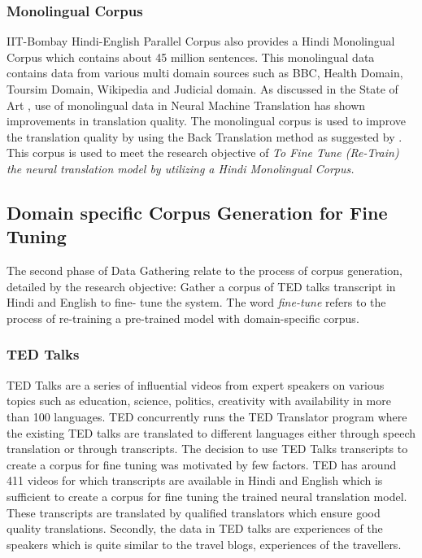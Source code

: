 \subsubsection{Monolingual Corpus}
\label{sec:mono}
IIT-Bombay Hindi-English Parallel Corpus also provides a Hindi Monolingual Corpus which contains about 45 million sentences. This monolingual data contains data from various multi domain sources such as BBC, Health Domain, Toursim Domain, Wikipedia and Judicial domain. As discussed in the State of Art , use of monolingual data in Neural Machine Translation has shown improvements in translation quality. The monolingual corpus is used to improve the translation quality by using the Back Translation method as suggested by \cite{DBLP:journals/corr/SennrichHB15a}. This corpus is used to meet the research objective of \textit{To Fine Tune (Re-Train) the neural translation model by utilizing a Hindi Monolingual Corpus.}

\subsection{Domain specific Corpus Generation for Fine Tuning}
The second phase of Data Gathering relate to the process of corpus generation, detailed by the research objective: Gather a corpus of TED talks transcript in Hindi and English to fine- tune the system. The word \textit{fine-tune} refers to the process of re-training a pre-trained model with domain-specific corpus.

\subsubsection{TED Talks} 
TED Talks are a series of influential videos from expert speakers on various topics such as education, science, politics, creativity with availability in more than 100 languages. TED concurrently runs the TED Translator program where the existing TED talks are translated to different languages either through speech translation or through transcripts. The decision to use TED Talks transcripts to create a corpus for fine tuning was motivated by few factors. TED has around 411 videos for which transcripts are available in Hindi and English which is sufficient to create a corpus for fine tuning the trained neural translation model. These transcripts are translated by qualified translators which ensure good quality translations. Secondly, the data in TED talks are experiences of the speakers which is quite similar to the travel blogs, experiences of the travellers.

